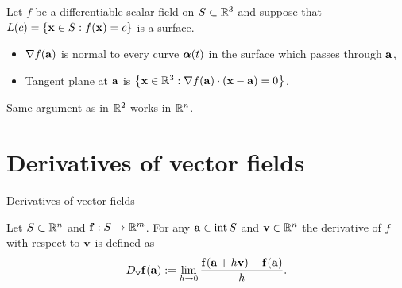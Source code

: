 Let \(f\) be a differentiable scalar field on \(S\subset \bR^3\) and suppose that \(L(c) = \left\{\xx\in S : f(\xx)=c\right\}\) is a surface.

\begin{itemize}
    \item \(\nabla f(\aa)\) is normal to every curve \(\aalpha(t)\) in the surface which passes through \(\aa\),
    \item Tangent plane at \(\aa\) is
          \(\left\{\xx\in\bR^3: \nabla f(\aa) \cdot (\xx-\aa)=0\right\}\).
\end{itemize}

Same argument as in \(\bR^2\) works in \(\bR^n\).









\section{Derivatives of vector fields}



 {Derivatives of vector fields}

\begin{definition}
    Let \(S\subset \bR^n\) and \(\ff:S\to \bR^m\).
    For any \(\aa \in \operatorname{int}S\) and \(\vv \in \bR^n\) the derivative of \(f\) with respect to \(\vv\) is defined as
    \[
        D_{\vv}\ff(\aa) :=
        \lim_{h\to 0} \frac{\ff(\aa+h \vv) - \ff(\aa)}{h}.
    \]
\end{definition}

